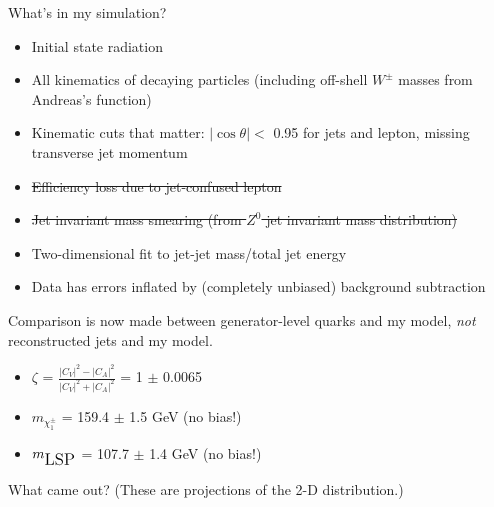 \documentclass[landscape]{article}
\begin{document}
What's in my simulation?

\begin{itemize}

\item Initial state radiation

\item All kinematics of decaying particles (including off-shell $W^\pm$ masses from Andreas's function)

\item Kinematic cuts that matter: $|\cos \theta| <$ 0.95 for jets and lepton, missing transverse jet momentum

\item \sout{Efficiency loss due to jet-confused lepton}

\item \sout{Jet invariant mass smearing (from $Z^0$ jet invariant mass distribution)}

\item Two-dimensional fit to jet-jet mass/total jet energy

\item Data has errors inflated by (completely unbiased) background subtraction

\end{itemize}

\vfill

Comparison is now made between generator-level quarks and my model,
{\it not} reconstructed jets and my model.

\vfill

\begin{center}
\begin{minipage}{0.5\linewidth}
\begin{itemize}\renewcommand{\labelitemi}{\mbox{ }}

  \item $\zeta$ = $\displaystyle \frac{|C_V|^2 - |C_A|^2}{|C_V|^2 + |C_A|^2}$ = 1 $\pm$ 0.0065

  \item $m_{\chi_1^\pm}$ = 159.4 $\pm$ 1.5 GeV (no bias!)

  \item $m_{\mbox{\large LSP}}$ = 107.7 $\pm$ 1.4 GeV (no bias!)

\end{itemize}
\end{minipage}
\end{center}

\pagebreak

What came out?  (These are projections of the 2-D distribution.)
\end{document}

